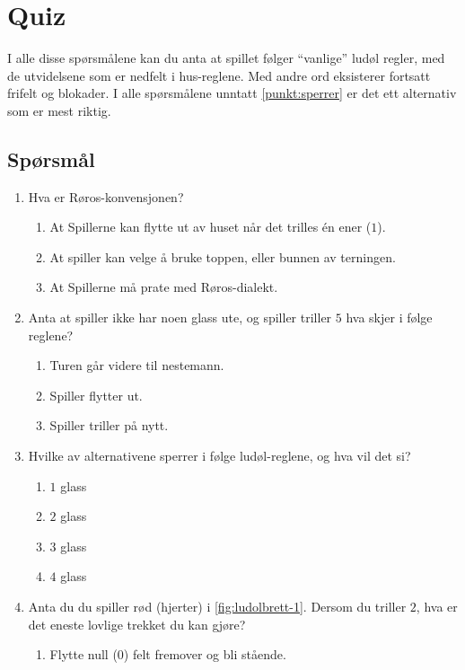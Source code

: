 \documentclass[10pt,a4paper,norsk,openany]{book}
\begin{document}
\chapter{Quiz}
\label{chap:quiz}
I alle disse spørsmålene kan du anta at spillet følger ``vanlige'' ludøl
regler, med de utvidelsene som er nedfelt i hus-reglene. Med andre ord
eksisterer fortsatt frifelt og blokader. I alle spørsmålene unntatt
\cref{punkt:sperrer} er det ett alternativ som er mest riktig.  

\section{Spørsmål}

\begin{enumerate}
  \item Hva er Røros-konvensjonen? 
    \begin{enumerate}
      \item At Spillerne kan flytte ut av huset når det trilles én ener ($1$).
      \item At spiller kan velge å bruke toppen, eller bunnen av terningen.
      \item At Spillerne må prate med Røros-dialekt.
    \end{enumerate}
  \item Anta at spiller ikke har noen glass ute, og spiller triller $5$ hva
    skjer i følge reglene? 
    \begin{enumerate}
    \item Turen går videre til nestemann.
    \item Spiller flytter ut.
    \item Spiller triller på nytt. 
    \end{enumerate}
  \item \label{punkt:sperrer} Hvilke av alternativene sperrer i følge ludøl-reglene, og hva vil
    det si?
    \begin{enumerate}
      \item $1$ glass
      \item $2$ glass
      \item $3$ glass
      \item $4$ glass
    \end{enumerate}
  \item Anta du du spiller rød (hjerter) i \cref{fig:ludolbrett-1}. Dersom du
    triller $2$, hva er det eneste lovlige trekket du kan gjøre?
    \begin{enumerate}
      \item Flytte null ($0$) felt fremover og bli stående.

\end{enumerate}
\end{enumerate}
\end{document}
